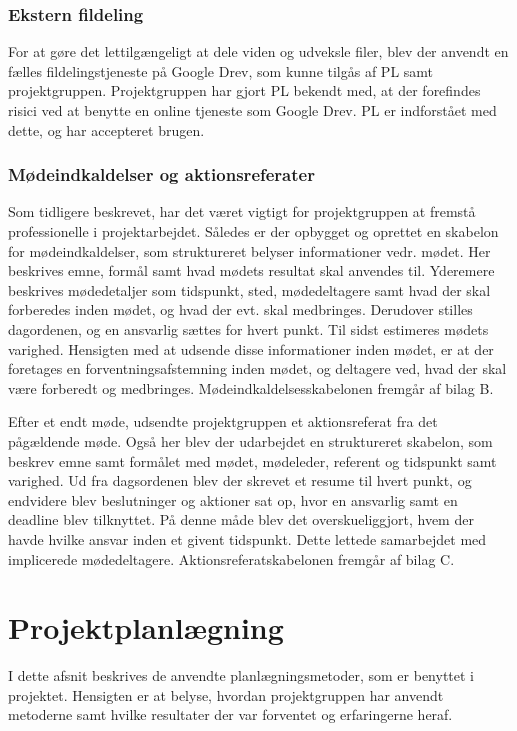 	\subsubsection{Ekstern fildeling}
	For at gøre det lettilgængeligt at dele viden og udveksle filer, blev der anvendt en fælles fildelingstjeneste på Google Drev, som kunne tilgås af PL samt projektgruppen.  
	Projektgruppen har gjort PL bekendt med, at der forefindes risici ved at benytte en online tjeneste som Google Drev. PL er indforstået med dette, og har accepteret brugen. 
	
	\subsubsection{Mødeindkaldelser og aktionsreferater}
	Som tidligere beskrevet, har det været vigtigt for projektgruppen at fremstå professionelle i projektarbejdet. Således er der opbygget og oprettet en skabelon for mødeindkaldelser, som struktureret belyser informationer vedr. mødet. Her beskrives emne, formål samt hvad mødets resultat skal anvendes til. Yderemere beskrives mødedetaljer som tidspunkt, sted, mødedeltagere samt hvad der skal forberedes inden mødet, og hvad der evt. skal medbringes. Derudover stilles dagordenen, og en ansvarlig sættes for hvert punkt. Til sidst estimeres mødets varighed. Hensigten med at udsende disse informationer inden mødet, er at der foretages en forventningsafstemning inden mødet, og deltagere ved, hvad der skal være forberedt og medbringes. Mødeindkaldelsesskabelonen fremgår af bilag B.  
	
	Efter et endt møde, udsendte projektgruppen et aktionsreferat fra det pågældende møde. Også her blev der udarbejdet en struktureret skabelon, som beskrev emne samt formålet med mødet, mødeleder, referent og tidspunkt samt varighed. Ud fra dagsordenen blev der skrevet et resume til hvert punkt, og endvidere blev beslutninger og aktioner sat op, hvor en ansvarlig samt en deadline blev tilknyttet. På denne måde blev det overskueliggjort, hvem der havde hvilke ansvar inden et givent tidspunkt. Dette lettede samarbejdet med implicerede mødedeltagere. Aktionsreferatskabelonen fremgår af bilag C.     

\section{Projektplanlægning}
	I dette afsnit beskrives de anvendte planlægningsmetoder, som er benyttet i projektet. Hensigten er at belyse, hvordan projektgruppen har anvendt metoderne samt hvilke resultater der var forventet og erfaringerne heraf.
	
